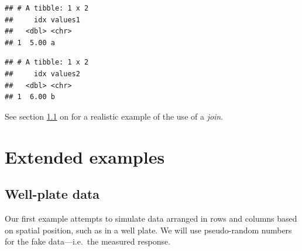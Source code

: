 \documentclass[krantz2,ChapterTOCs]{krantz}\usepackage{knitr}
\begin{document}
\begin{knitrout}\footnotesize
{}\color{fgcolor}\begin{kframe}
\begin{alltt}
\end{alltt}


{\ttfamily\noindent\itshape{}}\begin{verbatim}
## # A tibble: 1 x 2
##     idx values1
##   <dbl> <chr>  
## 1  5.00 a
\end{verbatim}
\end{kframe}
\end{knitrout}

\begin{knitrout}\footnotesize
{}\color{fgcolor}\begin{kframe}
\begin{alltt}
\end{alltt}


{\ttfamily\noindent\itshape{}}\begin{verbatim}
## # A tibble: 1 x 2
##     idx values2
##   <dbl> <chr>  
## 1  6.00 b
\end{verbatim}
\end{kframe}
\end{knitrout}

See section \ref{sec:dataex:well:plate} on \pageref{sec:dataex:well:plate} for a realistic example of the use of a \emph{join}.

\section{Extended examples}\label{sec:dataex}

\subsection{Well-plate data}\label{sec:dataex:well:plate}

Our first example attempts to simulate data arranged in rows and columns based on spatial position, such as in a well plate. We will use pseudo-random numbers for the fake data---i.e.\ the measured response.
\end{document}
